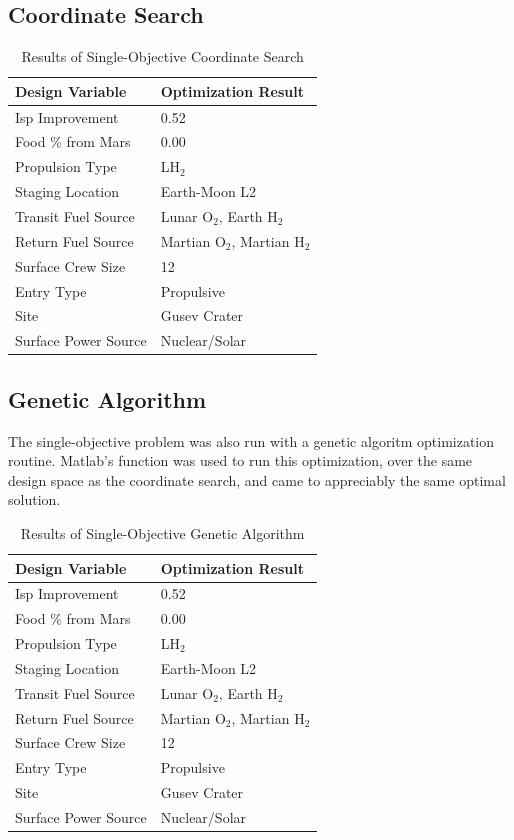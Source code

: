 \documentclass[]{aiaa-pretty}
\begin{document}
\subsection{Coordinate Search}
\begin{table}[h!]
	\centering
	\caption{Results of Single-Objective Coordinate Search}
	\label{tab:GAsingle}
	\begin{tabular}{ll}
		\textbf{Design Variable} & \textbf{Optimization Result}\\ \hline
		Isp Improvement & 0.52 \\
		Food \% from Mars & 0.00 \\
		Propulsion Type & LH$_2$ \\
		Staging Location & Earth-Moon L2 \\
		Transit Fuel Source & Lunar O$_2$, Earth H$_2$ \\
		Return Fuel Source & Martian O$_2$, Martian H$_2$ \\
		Surface Crew Size & 12\\
		Entry Type & Propulsive \\
		Site & Gusev Crater \\
		Surface Power Source & Nuclear/Solar\\
	\end{tabular}
\end{table}
\subsection{Genetic Algorithm}

The single-objective problem was also run with a genetic algoritm optimization routine. Matlab's  function was used to run this optimization, over the same design space as the coordinate search, and came to appreciably the same optimal solution.

\begin{table}[h!]
	\centering
	\caption{Results of Single-Objective Genetic Algorithm}
	\label{tab:GAsingle}
	\begin{tabular}{ll}
	\textbf{Design Variable} & \textbf{Optimization Result}\\ \hline
	Isp Improvement & 0.52 \\
	Food \% from Mars & 0.00 \\
	Propulsion Type & LH$_2$ \\
	Staging Location & Earth-Moon L2 \\
	Transit Fuel Source & Lunar O$_2$, Earth H$_2$ \\
	Return Fuel Source & Martian O$_2$, Martian H$_2$ \\
	Surface Crew Size & 12\\
	Entry Type & Propulsive \\
	Site & Gusev Crater \\
	Surface Power Source & Nuclear/Solar\\
	\end{tabular}
\end{table}
\end{document}
